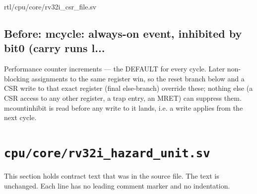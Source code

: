 \begin{relocated}{rtl/cpu/core/rv32i_csr_file.sv}
\subsection*{Before: mcycle: always-on event, inhibited by bit0 (carry runs l...}

\begin{textblock}
Performance counter increments — the DEFAULT for every cycle.  Later
non-blocking assignments to the same register win, so the reset branch
below and a CSR write to that exact register (final else-branch)
override these; nothing else (a CSR access to any other register, a
trap entry, an MRET) can suppress them.  mcountinhibit is read before
any write to it lands, i.e. a write applies from the next cycle.
\end{textblock}

\end{relocated}

\section{\texttt{cpu/core/rv32i\_hazard\_unit.sv}}\label{ds:mod:rv32i-hazard-unit}

This section holds contract text that was in the source file. The text is unchanged. Each line has no leading comment marker and no indentation.

